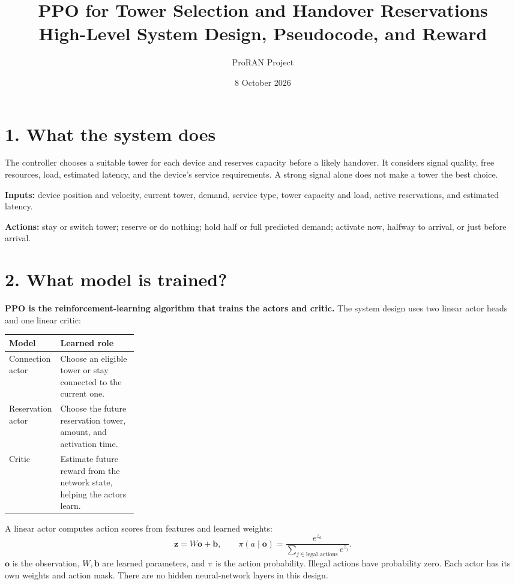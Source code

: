\documentclass[10pt,a4paper]{article}
\title{PPO for Tower Selection and Handover Reservations\\
\large High-Level System Design, Pseudocode, and Reward}
\author{ProRAN Project}
\date{8 October 2026}
\begin{document}
\maketitle
\setlength{\abovedisplayskip}{5pt}
\setlength{\belowdisplayskip}{5pt}
\setlength{\abovedisplayshortskip}{3pt}
\setlength{\belowdisplayshortskip}{3pt}

\section*{1. What the system does}
The controller chooses a suitable tower for each device and reserves capacity before a likely handover. It considers signal quality, free resources, load, estimated latency, and the device's service requirements. A strong signal alone does not make a tower the best choice.

\textbf{Inputs:} device position and velocity, current tower, demand, service type, tower capacity and load, active reservations, and estimated latency.

\textbf{Actions:} stay or switch tower; reserve or do nothing; hold half or full predicted demand; activate now, halfway to arrival, or just before arrival.

\section*{2. What model is trained?}
\textbf{PPO is the reinforcement-learning algorithm that trains the actors and critic.} The system design uses two linear actor heads and one linear critic:

\renewcommand{\arraystretch}{1.15}
\begin{tabularx}{\linewidth}{@{}>{\raggedright\arraybackslash}p{0.25\linewidth}X@{}}
\toprule Model & Learned role \\ \midrule
Connection actor & Choose an eligible tower or stay connected to the current one. \\
Reservation actor & Choose the future reservation tower, amount, and activation time. \\
Critic & Estimate future reward from the network state, helping the actors learn. \\
\bottomrule
\end{tabularx}

A linear actor computes action scores from features and learned weights:
\begin{equation}
\mathbf z=W\mathbf o+\mathbf b,
\qquad
\pi(a\mid\mathbf o)=\frac{e^{z_a}}{\sum_{j\in\text{legal actions}}e^{z_j}}.
\end{equation}
$\mathbf o$ is the observation, $W,\mathbf b$ are learned parameters, and $\pi$ is the action probability. Illegal actions have probability zero. Each actor has its own weights and action mask. There are no hidden neural-network layers in this design.
\end{document}
